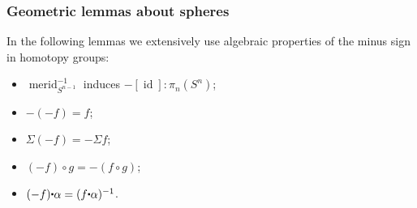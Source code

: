 \documentclass{amsart}
\theoremstyle{definition}
\newcommand{\id}{\operatorname{id}}
\newcommand{\merid}{\operatorname{merid}}
\newcommand{\whisk}{\raisebox{0.5ex}{$\displaystyle\centerdot$}}
\begin{document}
\subsubsection{Geometric lemmas about spheres}

In the following lemmas we extensively use algebraic properties of the minus sign in homotopy groups:
\begin{itemize}
    \item $\merid_{S^{n-1}}^{-1}$ induces $-[\id]: \pi_n(S^n)$;
    \item $-(-f) = f$;
    \item $\Sigma(-f) = -\Sigma f$;
    \item $(-f) \circ g = -(f \circ g)$;
    \item $(-f) \whisk \alpha = (f \whisk \alpha)^{-1}$.
\end{itemize}
\end{document}
